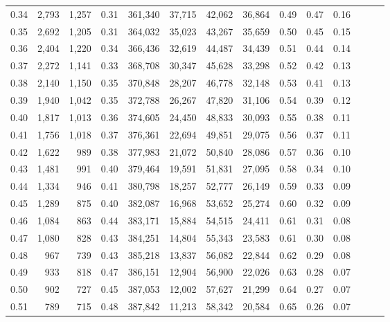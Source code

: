 \begin{tabular}{rrrrrrrrrrrrrr}
0.34 &   2,793 &  1,257 &  0.31 &  361,340 &   37,715 &  42,062 &  36,864 &  0.49 &  0.47 &      0.16 \\
0.35 &   2,692 &  1,205 &  0.31 &  364,032 &   35,023 &  43,267 &  35,659 &  0.50 &  0.45 &      0.15 \\
0.36 &   2,404 &  1,220 &  0.34 &  366,436 &   32,619 &  44,487 &  34,439 &  0.51 &  0.44 &      0.14 \\
0.37 &   2,272 &  1,141 &  0.33 &  368,708 &   30,347 &  45,628 &  33,298 &  0.52 &  0.42 &      0.13 \\
0.38 &   2,140 &  1,150 &  0.35 &  370,848 &   28,207 &  46,778 &  32,148 &  0.53 &  0.41 &      0.13 \\
0.39 &   1,940 &  1,042 &  0.35 &  372,788 &   26,267 &  47,820 &  31,106 &  0.54 &  0.39 &      0.12 \\
0.40 &   1,817 &  1,013 &  0.36 &  374,605 &   24,450 &  48,833 &  30,093 &  0.55 &  0.38 &      0.11 \\
0.41 &   1,756 &  1,018 &  0.37 &  376,361 &   22,694 &  49,851 &  29,075 &  0.56 &  0.37 &      0.11 \\
0.42 &   1,622 &    989 &  0.38 &  377,983 &   21,072 &  50,840 &  28,086 &  0.57 &  0.36 &      0.10 \\
0.43 &   1,481 &    991 &  0.40 &  379,464 &   19,591 &  51,831 &  27,095 &  0.58 &  0.34 &      0.10 \\
0.44 &   1,334 &    946 &  0.41 &  380,798 &   18,257 &  52,777 &  26,149 &  0.59 &  0.33 &      0.09 \\
0.45 &   1,289 &    875 &  0.40 &  382,087 &   16,968 &  53,652 &  25,274 &  0.60 &  0.32 &      0.09 \\
0.46 &   1,084 &    863 &  0.44 &  383,171 &   15,884 &  54,515 &  24,411 &  0.61 &  0.31 &      0.08 \\
0.47 &   1,080 &    828 &  0.43 &  384,251 &   14,804 &  55,343 &  23,583 &  0.61 &  0.30 &      0.08 \\
0.48 &     967 &    739 &  0.43 &  385,218 &   13,837 &  56,082 &  22,844 &  0.62 &  0.29 &      0.08 \\
0.49 &     933 &    818 &  0.47 &  386,151 &   12,904 &  56,900 &  22,026 &  0.63 &  0.28 &      0.07 \\
0.50 &     902 &    727 &  0.45 &  387,053 &   12,002 &  57,627 &  21,299 &  0.64 &  0.27 &      0.07 \\
0.51 &     789 &    715 &  0.48 &  387,842 &   11,213 &  58,342 &  20,584 &  0.65 &  0.26 &      0.07 \\

\end{tabular}
